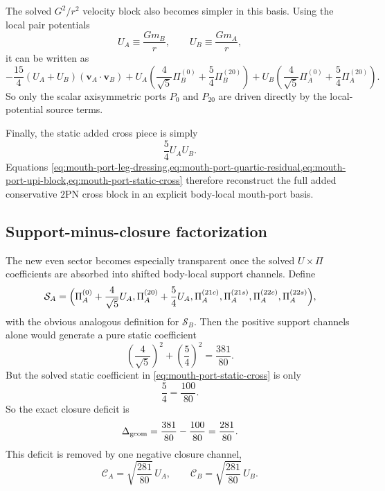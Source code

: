 \documentclass[11pt]{article}
\newcommand{\TwoPN}{\mathrm{2PN}}
\begin{document}
The solved \(G^2/r^2\) velocity block also becomes simpler in this basis.  Using the
local pair potentials
\begin{equation}
U_A\equiv \frac{Gm_B}{r},
\qquad
U_B\equiv \frac{Gm_A}{r},
\label{eq:mouth-port-UAUB}
\end{equation}
it can be written as
\begin{equation}
-\frac{15}{4}(U_A+U_B)(\mathbf v_A\!\cdot\!\mathbf v_B)
+U_A\left(\frac{4}{\sqrt5}\Pi_B^{(0)}+\frac54\Pi_B^{(20)}\right)
+U_B\left(\frac{4}{\sqrt5}\Pi_A^{(0)}+\frac54\Pi_A^{(20)}\right).
\label{eq:mouth-port-upi-block}
\end{equation}
So only the scalar axisymmetric ports \(P_0\) and \(P_{20}\) are driven directly by the
local-potential source terms.

Finally, the static added cross piece is simply
\begin{equation}
\frac54 U_AU_B.
\label{eq:mouth-port-static-cross}
\end{equation}
Equations
\cref{eq:mouth-port-leg-dressing,eq:mouth-port-quartic-residual,eq:mouth-port-upi-block,eq:mouth-port-static-cross}
therefore reconstruct the full added conservative \(\TwoPN\) cross block in an explicit
body-local mouth-port basis.

\subsection{Support-minus-closure factorization}
\label{app:mouth-port-support}

The new even sector becomes especially transparent once the solved
\(U\times\Pi\) coefficients are absorbed into shifted body-local support channels.
Define
\begin{equation}
\mathcal S_A=
\Bigl(
\Pi_A^{(0)}+\frac{4}{\sqrt5}U_A,
\Pi_A^{(20)}+\frac54 U_A,
\Pi_A^{(21c)},
\Pi_A^{(21s)},
\Pi_A^{(22c)},
\Pi_A^{(22s)}
\Bigr),
\label{eq:mouth-port-support-A}
\end{equation}
with the obvious analogous definition for \(\mathcal S_B\).
Then the positive support channels alone would generate a pure static coefficient
\begin{equation}
\left(\frac{4}{\sqrt5}\right)^2+\left(\frac54\right)^2
=\frac{381}{80}.
\label{eq:mouth-port-support-static}
\end{equation}
But the solved static coefficient in \cref{eq:mouth-port-static-cross} is only
\begin{equation}
\frac54=\frac{100}{80}.
\label{eq:mouth-port-target-static}
\end{equation}
So the exact closure deficit is
\begin{equation}
\Delta_{\rm geom}=\frac{381}{80}-\frac{100}{80}=\frac{281}{80}.
\label{eq:mouth-port-delta-geom}
\end{equation}
This deficit is removed by one negative closure channel,
\begin{equation}
\mathcal C_A=\sqrt{\frac{281}{80}}\,U_A,
\qquad
\mathcal C_B=\sqrt{\frac{281}{80}}\,U_B.
\label{eq:mouth-port-closure-channel}
\end{equation}
\end{document}
